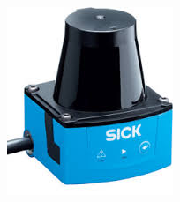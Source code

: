 \begin{frame}
\begin{figure}[!h]
    		{
    			\includegraphics[width=0.15\columnwidth,valign=m]{./images/lidar_sick.jpg}
    		}
    	\end{figure}
    
\end{frame}

